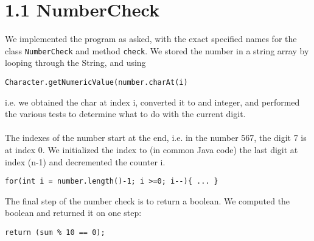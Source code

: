 \section*{1.1 NumberCheck}

We implemented the program as asked, with the exact specified names for the class \texttt{NumberCheck}  and method \texttt{check}. We stored the number in a string array by looping through the String, and using

\begin{lstlisting}
Character.getNumericValue(number.charAt(i)
\end{lstlisting}

i.e. we obtained the char at index i, converted it to and integer, and performed the various tests to determine what to do with the current digit.\\
\\
The indexes of the number start at the end, i.e. in the number 567, the digit 7 is at index 0. We initialized the index to (in common Java code) the last digit at index (n-1) and decremented the counter i.

\begin{lstlisting}
for(int i = number.length()-1; i >=0; i--){ ... }
\end{lstlisting}

The final step of the number check is to return a boolean. We computed the boolean and returned it on one step:
\begin{lstlisting}
return (sum % 10 == 0);
\end{lstlisting}